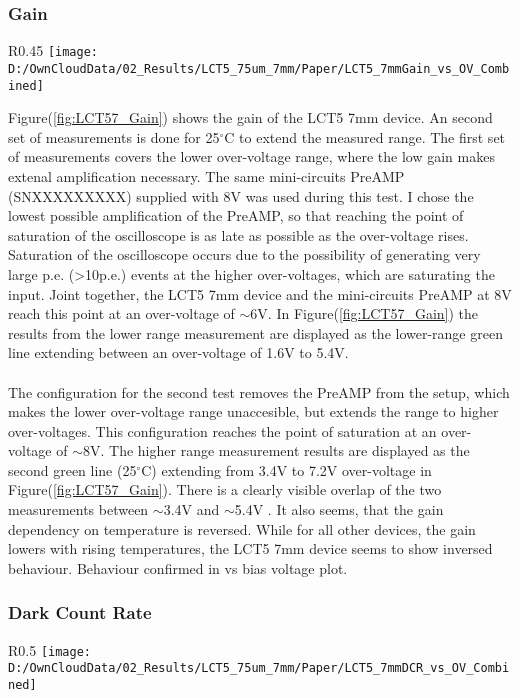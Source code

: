 \documentclass[article,type=msc,colorback,accentcolor=tud9c]{tudthesis}
\begin{document}
\subsubsection{Gain}
\label{subsubsec:LCT57Gain}
\begin{wrapfigure}{R}{0.45\textwidth}
\centering
\texttt{[image: D:/OwnCloudData/02\_Results/LCT5\_75um\_7mm/Paper/LCT5\_7mmGain\_vs\_OV\_Combined]}
\caption{\label{fig:LCT57_Gain}Gain of the HPK LCT5 7mm pixel}
\end{wrapfigure}
Figure(\ref{fig:LCT57_Gain}) shows the gain of the LCT5 7mm device. An second set of measurements is done for 25$^\circ$C to extend the measured range. The first set of measurements covers the lower over-voltage range, where the low gain makes extenal amplification necessary. The same mini-circuits PreAMP (SNXXXXXXXXX) supplied with 8V was used during this test. I chose the lowest possible amplification of the PreAMP, so that reaching the point of saturation of the oscilloscope is as late as possible as the over-voltage rises. Saturation of the oscilloscope occurs due to the possibility of generating very large p.e. (>10p.e.) events at the higher over-voltages, which are saturating the input. Joint together, the LCT5 7mm device and the mini-circuits PreAMP at 8V reach this point at an over-voltage of $\sim$6V. In Figure(\ref{fig:LCT57_Gain}) the results from the lower range measurement are displayed as the lower-range green line extending between an over-voltage of 1.6V to 5.4V.
\\\\
The configuration for the second test removes the PreAMP from the setup, which makes the lower over-voltage range unaccesible, but extends the range to higher over-voltages. This configuration reaches the point of saturation at an over-voltage of $\sim$8V. The higher range measurement results are displayed as the second green line (25$^\circ$C) extending from 3.4V to 7.2V over-voltage in Figure(\ref{fig:LCT57_Gain}). There is a clearly visible overlap of the two measurements between $\sim$3.4V and $\sim$5.4V . It also seems, that the gain dependency on temperature is reversed. While for all other devices, the gain lowers with rising temperatures, the LCT5 7mm device seems to show inversed behaviour. Behaviour confirmed in vs bias voltage plot.


\newpage
\subsubsection{Dark Count Rate}
\begin{wrapfigure}{R}{0.5\textwidth}
\centering
\texttt{[image: D:/OwnCloudData/02\_Results/LCT5\_75um\_7mm/Paper/LCT5\_7mmDCR\_vs\_OV\_Combined]}
\caption{\label{fig:LCT57_DCR}Dark Count Rate of the HPK LCT5 7mm pixel}
\end{wrapfigure}
\end{document}
